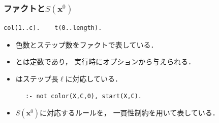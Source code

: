 \documentclass[dvipdfmx,11pt]{beamer}
\begin{document}
\begin{frame}[fragile]\frametitle{ファクトと$S(\bm{x}^0)$}
  
  \begin{exampleblock}{}
    \begin{lstlisting}[]
      col(1..c).    t(0..length).
    \end{lstlisting}
  \end{exampleblock}
  \begin{itemize}
    \item 色数とステップ数をファクトで表している．
    \item {}とは定数であり，
          実行時にオプションから与えられる．
    \item {}はステップ長$\ell$に対応している．
  \end{itemize}

  \begin{exampleblock}{}
    \centering
    \begin{lstlisting}
      :- not color(X,C,0), start(X,C).
    \end{lstlisting}
  \end{exampleblock}
  \begin{itemize}
    \item $S(\bm{x}^0)$に対応するルールを，
          一貫性制約を用いて表している．
  \end{itemize}

\end{frame}
\end{document}
